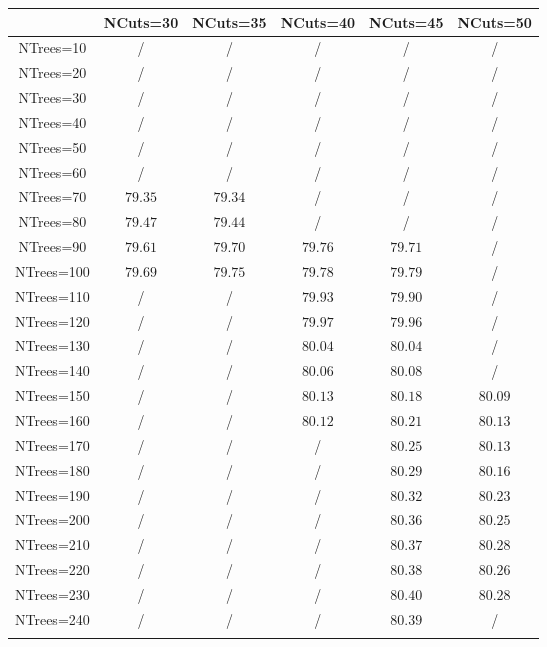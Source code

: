\centering
\begin{tabular}{cccccc} \toprule\toprule
 & NCuts=30 & NCuts=35 & NCuts=40 & NCuts=45 & NCuts=50\\\midrule
NTrees=10 &  / &  / &  / &  / &  /\\
NTrees=20 &  / &  / &  / &  / &  /\\
NTrees=30 &  / &  / &  / &  / &  /\\
NTrees=40 &  / &  / &  / &  / &  /\\
NTrees=50 &  / &  / &  / &  / &  /\\
NTrees=60 &  / &  / &  / &  / &  /\\
NTrees=70 & $79.35$ & $79.34$ &  / &  / &  /\\
NTrees=80 & $79.47$ & $79.44$ &  / &  / &  /\\
NTrees=90 & $79.61$ & $79.70$ & $79.76$ & $79.71$ &  /\\
NTrees=100 & $79.69$ & $79.75$ & $79.78$ & $79.79$ &  /\\
NTrees=110 &  / &  / & $79.93$ & $79.90$ &  /\\
NTrees=120 &  / &  / & $79.97$ & $79.96$ &  /\\
NTrees=130 &  / &  / & $80.04$ & $80.04$ &  /\\
NTrees=140 &  / &  / & $80.06$ & $80.08$ &  /\\
NTrees=150 &  / &  / & $80.13$ & $80.18$ & $80.09$\\
NTrees=160 &  / &  / & $80.12$ & $80.21$ & $80.13$\\
NTrees=170 &  / &  / &  / & $80.25$ & $80.13$\\
NTrees=180 &  / &  / &  / & $80.29$ & $80.16$\\
NTrees=190 &  / &  / &  / & $80.32$ & $80.23$\\
NTrees=200 &  / &  / &  / & $80.36$ & $80.25$\\
NTrees=210 &  / &  / &  / & $80.37$ & $80.28$\\
NTrees=220 &  / &  / &  / & $80.38$ & $80.26$\\
NTrees=230 &  / &  / &  / & $80.40$ & $80.28$\\
NTrees=240 &  / &  / &  / & $80.39$ &  /\\
\bottomrule\bottomrule\\
\end{tabular}
